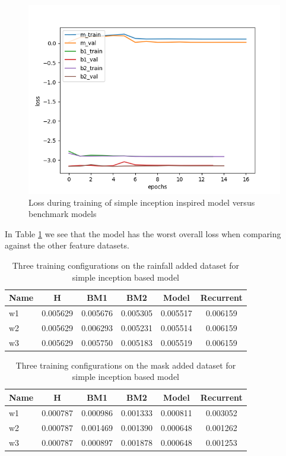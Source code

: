 \begin{figure}[tbph]
	\centering
	\includegraphics[width=0.8\linewidth, height=0.3\textheight]{Figures/Results/Inception_model/simple_incep_train_5_custom_mae_weighted_8_norm_independant_rf_added_292_training}
	\caption[Loss during training of simple inception inspired model versus benchmark models]{Loss during training of simple inception inspired model versus benchmark models}
	\label{fig:simple-incep-loss}
\end{figure}

In Table \ref{tab:simple_rf} we see that the model has the worst overall loss when comparing against the other feature datasets.
\begin{table}[htbp]
	\centering
	\caption{Three training configurations on the rainfall added dataset for simple inception based model}
	\label{tab:simple_rf}
	\begin{tabular}{p{2cm}ccccc}
		\toprule
		Name &  H &  BM1 &  BM2 &  Model &  Recurrent \\
		\midrule
		w1 &       0.005629 &        0.005676 &        0.005305 &   0.005517 &            0.006159 \\
		w2 &       0.005629 &        0.006293 &        0.005231 &   0.005514 &            0.006159 \\
		w3 &       0.005629 &        0.005750 &        0.005183 &   0.005519 &            0.006159 \\
		\bottomrule
	\end{tabular}
\end{table}

\begin{table}[htbp]
	\centering
	\caption{Three training configurations on the mask added dataset for simple inception based model}
	\label{tab:simple_mask}
	\begin{tabular}{p{2cm}ccccc}
		\toprule
		Name &  H &  BM1 &  BM2 &  Model &  Recurrent \\
		\midrule
		w1 &       0.000787 &        0.000986 &        0.001333 &   0.000811 &            0.003052 \\
		w2 &       0.000787 &        0.001469 &        0.001390 &   0.000648 &            0.001262 \\
		w3 &       0.000787 &        0.000897 &        0.001878 &   0.000648 &            0.001253 \\
		\bottomrule
	\end{tabular}
\end{table}


